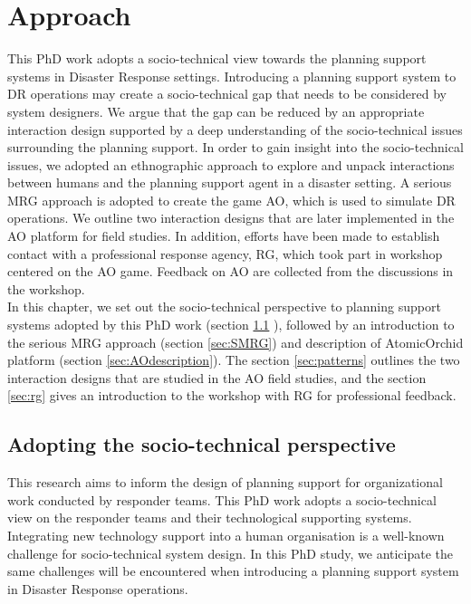 \chapter{Approach}\label{ch:approach}
This PhD work adopts a socio-technical view towards the planning support systems in Disaster Response settings. Introducing a planning support system to \acf{DR} operations may create a socio-technical gap that needs to be considered by system designers. We argue that the gap can be reduced by an appropriate interaction design supported by a deep understanding of the socio-technical issues surrounding the planning support. In order to gain insight into the socio-technical issues, we adopted an ethnographic approach to explore and unpack interactions between humans and the planning support agent in a disaster setting. A serious \acf{MRG} approach is adopted to create the game \acf{AO}, which is used to simulate \ac{DR} operations. We outline two interaction designs that are later implemented in the \ac{AO} platform for field studies. In addition, efforts have been made to establish contact with a professional response agency, \acf{RG}, which took part in workshop centered on the \ac{AO} game. Feedback on \ac{AO} are collected from the discussions in the workshop. \\

In this chapter, we set out the socio-technical perspective to planning support systems adopted by this PhD work (section \ref{sec:sociotech} ), followed by an introduction to the serious \acf{MRG} approach (section \ref{sec:SMRG}) and description of AtomicOrchid platform (section \ref{sec:AOdescription}). The section \ref{sec:patterns} outlines the two interaction designs that are studied in the \ac{AO} field studies, and the section \ref{sec:rg} gives an introduction to the workshop with \ac{RG} for professional feedback. \\


\section{Adopting the socio-technical perspective}\label{sec:sociotech}
This research aims to inform the design of planning support for organizational work conducted by responder teams. This PhD work adopts a socio-technical view on the responder teams and their technological supporting systems. Integrating new technology support into a human organisation is a well-known challenge for socio-technical system design. In this PhD study, we anticipate the same challenges will be encountered when introducing a planning support system in Disaster Response operations.\\

